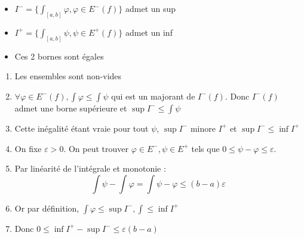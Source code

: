 \documentclass[french]{yLectureNote}
\begin{document}
\begin{theorem}
 \begin{itemize}
  \item \(I^-= \{\int_{[a,b]}\varphi,\varphi \in E^-(f)\}\) admet un sup
    \item \(I^+= \{\int_{[a,b]}\psi,\psi \in E^+(f)\}\) admet un inf
    \item Ces 2 bornes sont égales
 \end{itemize}
\end{theorem}
\begin{myproof}
 \begin{enumerate}
  \item Les ensembles sont non-vides
  \item \(\forall \varphi \in E^-(f), \int \varphi \leq \int \psi\) qui est un majorant de \(I^-(f)\).
  Donc \(I^-(f)\) admet une borne supérieure et \(\sup I^-\leq \int \psi\)
  \item Cette inégalité étant vraie pour tout \(\psi\), \(\sup I^-\) minore \(I^+\) et \(\sup I^-\leq \inf I^+\)
  \item On fixe \(\varepsilon >0\). On peut trouver \(\varphi \in E^-, \psi \in E^+\) tels que \(0\leq \psi-\varphi\leq \varepsilon\).
  \item Par linéarité de l'intégrale et monotonie : \[\int \psi - \int \varphi = \int \psi-\varphi \leq (b-a)\varepsilon\]
  \item Or par définition, \(\int \varphi \leq \sup I^-, \int \leq \inf I^+\)
  \item Donc \(0\leq \inf I^+-\sup I^- \leq \varepsilon(b-a)\)
 \end{enumerate}

\end{myproof}
\end{document}
